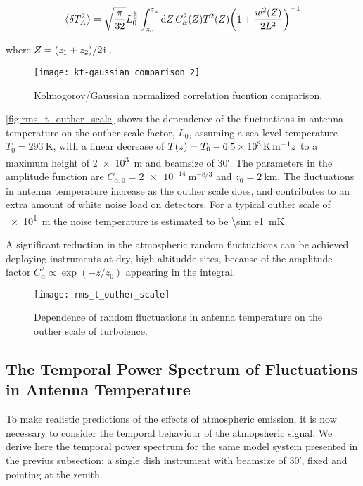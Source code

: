 \begin{equation}
        \expval{\var{T^2_A}} = \sqrt{\frac{\pi}{32}} L^\frac{5}{3}_0
        \int^{z_u}_{z_c} \dd{Z} C^2_\alpha\qty(Z) T^2\qty(Z)
        \qty(1 + \frac{w^2\qty(Z)}{2L^2})^{-1}
\end{equation}

where $Z = \qty(z_1 + z_2)/2$i \autocite{church1995predicting}.

\begin{figure}
        \centering
        \texttt{[image: kt-gaussian\_comparison\_2]}
        \caption{Kolmogorov/Gaussian normalized correlation fucntion
        comparison.}
        \label{fig:kt-gaussian_comparison_2}
\end{figure}

\autoref{fig:rms_t_outher_scale} shows the dependence of the fluctuations
in antenna temperature on the outher scale factor, $L_0$, assuming a sea
level temperature $T_0 = \SI{293}{\kelvin}$, with a linear decrease of $T\qty(z)
= T_0 - \SI{6.5e3}{\kelvin\per\meter}z$ to a maximum height of
\SI{2e3}{\meter} and beamsize of
\ang{;30;}. The parameters in the amplitude function are $C_{\alpha,0}
= \SI{2e-14}{\meter^{-8/3}}$ and $z_0 = \SI{2}{\kilo\meter}$. The fluctuations
in antenna temperature increase as the outher scale does, and
contributes to an extra amount of white noise load on detectors. For a
typical outher scale of \SI{e1}{\meter} the noise temperature is estimated
to be \SI{\sim e1}{\milli\kelvin}.

A significant reduction in the atmospheric
random fluctuations can be achieved deploying instruments
at dry, high altitudde sites, because of the amplitude factor $C^2_\alpha \propto
\exp(-z/z_0)$ appearing in the integral.

\begin{figure}
        \centering
        \texttt{[image: rms\_t\_outher\_scale]}
        \caption{Dependence of random fluctuations in antenna temperature
        on the outher scale of turbolence.}
        \label{fig:rms_t_outher_scale}
\end{figure}

\subsection{The Temporal Power Spectrum of Fluctuations in Antenna
Temperature}

To make realistic predictions of the effects of atmospheric emission, it is
now necessary to consider the temporal behaviour of the atmopsheric signal.
We derive here the temporal power spectrum for the same model system
presented in the previus subsection: a single dish instrument with beamsize
of \ang{;30;}, fixed and
pointing at the zenith.

